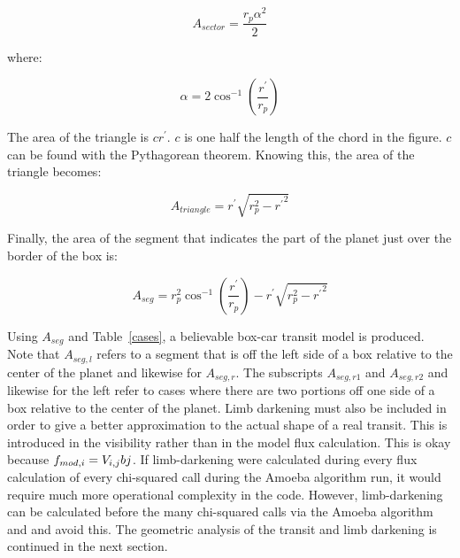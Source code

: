 \begin{equation}
	A_{sector} = \frac{r_p \alpha^2}{2}
\end{equation}

where:

\begin{equation}
	\alpha = 2 \cos^{-1}\left(\frac{r^{\prime}}{r_p}\right)
\end{equation}

The area of the triangle is $cr^{\prime}$. $c$ is one half the length of the chord in the figure. $c$ can be found with the Pythagorean theorem. Knowing this, the area of the triangle becomes: 

\begin{equation}
	A_{triangle} = r^{\prime}\sqrt{r_p^2 - {r^{\prime}}^2}
\end{equation}

Finally, the area of the segment that indicates the part of the planet just over the border of the box is:

\begin{equation}
	A_{seg} = r_p^2 \cos^{-1}\left(\frac{r^{\prime}}{r_p}\right) - r^{\prime} \sqrt{r_p^2 - {r^{\prime}}^2}
\end{equation}

Using $A_{seg} $ and Table~\ref{cases}, a believable box-car transit model is produced. Note that $A_{seg,l}$ refers to a segment that is off the left side of a box relative to the center of the planet and likewise for $A_{seg,r}$. The subscripts $A_{seg,r1}$ and $A_{seg,r2}$ and likewise for the left refer to cases where there are two portions off one side of a box relative to the center of the planet. Limb darkening must also be included in order to give a better approximation to the actual shape of a real transit. This is introduced in the visibility rather than in the model flux calculation. This is okay because $\mbox{$f_{mod,i}$} = V_{i,j} b{j}$. If limb-darkening were calculated during every flux calculation of every chi-squared call during the Amoeba algorithm run, it would require much more operational complexity in the code. However, limb-darkening can be calculated before the many chi-squared calls via the Amoeba algorithm and and avoid this.  The geometric analysis of the transit and limb darkening is continued in the next section.

